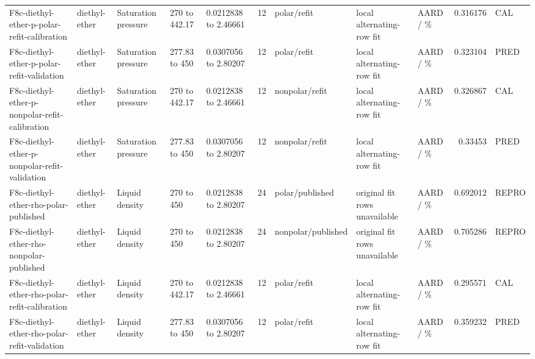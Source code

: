 \begin{landscape}
\begin{longtable}{L{1.9cm}L{2.5cm}L{2.1cm}L{1.6cm}L{1.6cm}rL{2.4cm}L{1.9cm}L{2.2cm}rL{1cm}}
F8c-\allowbreak{}diethyl-\allowbreak{}ether-\allowbreak{}p-\allowbreak{}polar-\allowbreak{}refit-\allowbreak{}calibration & diethyl-\allowbreak{}ether & Saturation pressure & 270 to 442.17 & 0.0212838 to 2.46661 & 12 & polar/\allowbreak{}refit & local alternating-\allowbreak{}row fit & AARD /\allowbreak{} \% & 0.316176 & CAL \\
F8c-\allowbreak{}diethyl-\allowbreak{}ether-\allowbreak{}p-\allowbreak{}polar-\allowbreak{}refit-\allowbreak{}validation & diethyl-\allowbreak{}ether & Saturation pressure & 277.83 to 450 & 0.0307056 to 2.80207 & 12 & polar/\allowbreak{}refit & local alternating-\allowbreak{}row fit & AARD /\allowbreak{} \% & 0.323104 & PRED \\
F8c-\allowbreak{}diethyl-\allowbreak{}ether-\allowbreak{}p-\allowbreak{}nonpolar-\allowbreak{}refit-\allowbreak{}calibration & diethyl-\allowbreak{}ether & Saturation pressure & 270 to 442.17 & 0.0212838 to 2.46661 & 12 & nonpolar/\allowbreak{}refit & local alternating-\allowbreak{}row fit & AARD /\allowbreak{} \% & 0.326867 & CAL \\
F8c-\allowbreak{}diethyl-\allowbreak{}ether-\allowbreak{}p-\allowbreak{}nonpolar-\allowbreak{}refit-\allowbreak{}validation & diethyl-\allowbreak{}ether & Saturation pressure & 277.83 to 450 & 0.0307056 to 2.80207 & 12 & nonpolar/\allowbreak{}refit & local alternating-\allowbreak{}row fit & AARD /\allowbreak{} \% & 0.33453 & PRED \\
F8c-\allowbreak{}diethyl-\allowbreak{}ether-\allowbreak{}rho-\allowbreak{}polar-\allowbreak{}published & diethyl-\allowbreak{}ether & Liquid density & 270 to 450 & 0.0212838 to 2.80207 & 24 & polar/\allowbreak{}published & original fit rows unavailable & AARD /\allowbreak{} \% & 0.692012 & REPRO \\
F8c-\allowbreak{}diethyl-\allowbreak{}ether-\allowbreak{}rho-\allowbreak{}nonpolar-\allowbreak{}published & diethyl-\allowbreak{}ether & Liquid density & 270 to 450 & 0.0212838 to 2.80207 & 24 & nonpolar/\allowbreak{}published & original fit rows unavailable & AARD /\allowbreak{} \% & 0.705286 & REPRO \\
F8c-\allowbreak{}diethyl-\allowbreak{}ether-\allowbreak{}rho-\allowbreak{}polar-\allowbreak{}refit-\allowbreak{}calibration & diethyl-\allowbreak{}ether & Liquid density & 270 to 442.17 & 0.0212838 to 2.46661 & 12 & polar/\allowbreak{}refit & local alternating-\allowbreak{}row fit & AARD /\allowbreak{} \% & 0.295571 & CAL \\
F8c-\allowbreak{}diethyl-\allowbreak{}ether-\allowbreak{}rho-\allowbreak{}polar-\allowbreak{}refit-\allowbreak{}validation & diethyl-\allowbreak{}ether & Liquid density & 277.83 to 450 & 0.0307056 to 2.80207 & 12 & polar/\allowbreak{}refit & local alternating-\allowbreak{}row fit & AARD /\allowbreak{} \% & 0.359232 & PRED \\

\end{longtable}
\end{landscape}
